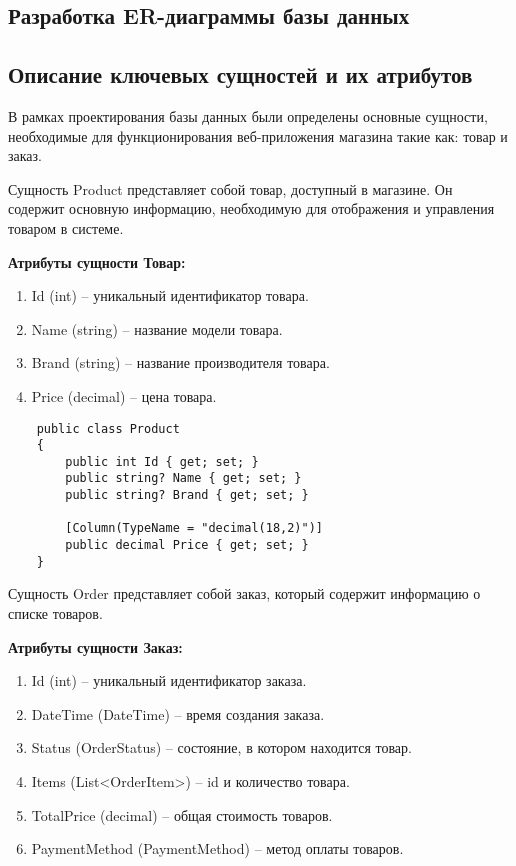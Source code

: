 \documentclass[a4paper,12pt]{report}
\begin{document}
\subsection{Разработка ER-диаграммы базы данных}

\subsection{Описание ключевых сущностей и их атрибутов}

В рамках проектирования базы данных были определены основные сущности, необходимые для функционирования веб-приложения магазина такие как: товар и заказ.

Сущность Product представляет собой товар, доступный в магазине. Он содержит основную информацию, необходимую для отображения и управления товаром в системе.

\textbf{Атрибуты сущности Товар:}
\begin{enumerate}
    \item
        Id (int) -- уникальный идентификатор товара.
    \item
        Name (string) -- название модели товара.
    \item
        Brand (string) -- название производителя товара.
    \item
        Price (decimal) -- цена товара.
\end{enumerate}

\begin{verbatim}
    public class Product
    {
        public int Id { get; set; } 
        public string? Name { get; set; }
        public string? Brand { get; set; }  
    
        [Column(TypeName = "decimal(18,2)")]  
        public decimal Price { get; set; }  
    }
\end{verbatim}

Сущность Order представляет собой заказ, который содержит информацию о списке товаров.

\textbf{Атрибуты сущности Заказ:}
\begin{enumerate}
    \item
        Id (int) -- уникальный идентификатор заказа.
    \item
        DateTime (DateTime) -- время создания заказа.
    \item
        Status (OrderStatus) -- состояние, в котором находится товар.
    \item
        Items (List<OrderItem>) -- id и количество товара.
    \item
        TotalPrice (decimal) -- общая стоимость товаров.
    \item
        PaymentMethod (PaymentMethod) -- метод оплаты товаров.
\end{enumerate}
\end{document}
